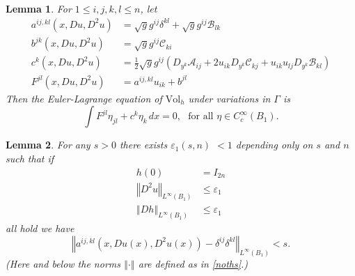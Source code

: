 \documentclass[12pt,leqno]{amsart}%
\theoremstyle{plain}
\newtheorem{lemma}{Lemma}[section]
\numberwithin{equation}{section}
\theoremstyle{definition}
\begin{document}
\begin{lemma}
For $1\leq i,j,k,l\leq n$, let
\begin{align}
a^{ij,kl}(x,Du,D^{2}u)  &  =\sqrt{g}g^{ij}\delta^{kl}+\sqrt{g}g^{ij}%
{\mathcal{B}}_{lk}\label{l324}\\
b^{jk}(x,Du,D^{2}u)  &  =\sqrt{g}g^{ij}{\mathcal{C}}_{ki}\nonumber\\
c^{k}(x,Du,D^{2}u)  &  =\frac{1}{2}\sqrt{g}g^{ij}\left(  D_{{y^{k}}%
}{\mathcal{A}}_{ij}+2u_{ik}D_{{y^{k}}}{\mathcal{C}}_{kj}+u_{ik}u_{lj}%
D_{{y^{k}}}{\mathcal{B}}_{kl}\right) \nonumber\\
F^{jl}(x,Du,D^{2}u)  &  =a^{ij,kl}u_{ik}+b^{jl} \label{l344}%
\end{align}
Then the Euler-Lagrange equation of $\mbox{Vol}_{h}$ under variations in
$\Gamma$ is
\begin{equation}
\int F^{jl}\eta_{jl}+c^{k}\eta_{k}\,dx=0,\ \ \ \text{for all }\eta\in
C_{c}^{\infty}(B_{1}). \label{EL equation}%
\end{equation}

\end{lemma}

\begin{lemma}
\label{ellipticity} For any $s>0$ there exists $\varepsilon_{1}(s,n)$ $<1$
depending only on $s$ and $n$ such that if
\begin{align*}
h(0) &  =I_{2n}\\
\left\Vert D^{2}u\right\Vert _{L^{\infty}(B_{1})} &  \leq\varepsilon_{1}\\
\left\Vert Dh\right\Vert _{L^{\infty}(B_{1})} &  \leq\varepsilon_{1}%
\end{align*}
all hold we have%
\[
\left\Vert a^{ij,kl}(x,Du(x),D^{2}u(x))-\delta^{ij}\delta^{kl}\right\Vert
_{L^{\infty}(B_{1})}<s.
\]
(Here and below the norms $\left\Vert \cdot\right\Vert$ are defined as in
\eqref{noths}.)\ 
\end{lemma}
\end{document}
